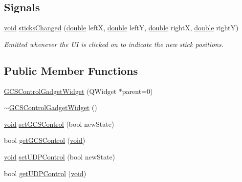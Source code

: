 \subsection*{Signals}
\begin{DoxyCompactItemize}
\item 
\hyperlink{group___u_a_v_objects_plugin_ga444cf2ff3f0ecbe028adce838d373f5c}{void} \hyperlink{group___g_c_s_control_gadget_plugin_gacad03ad4b99da2390b6a712a475b4987}{sticks\-Changed} (\hyperlink{_super_l_u_support_8h_a8956b2b9f49bf918deed98379d159ca7}{double} left\-X, \hyperlink{_super_l_u_support_8h_a8956b2b9f49bf918deed98379d159ca7}{double} left\-Y, \hyperlink{_super_l_u_support_8h_a8956b2b9f49bf918deed98379d159ca7}{double} right\-X, \hyperlink{_super_l_u_support_8h_a8956b2b9f49bf918deed98379d159ca7}{double} right\-Y)
\begin{DoxyCompactList}\small\item\em Emitted whenever the U\-I is clicked on to indicate the new stick positions. \end{DoxyCompactList}\end{DoxyCompactItemize}
\subsection*{Public Member Functions}
\begin{DoxyCompactItemize}
\item 
\hyperlink{group___g_c_s_control_gadget_plugin_ga631488a05f2911312aa2701deafc099e}{G\-C\-S\-Control\-Gadget\-Widget} (Q\-Widget $\ast$parent=0)
\item 
\hyperlink{group___g_c_s_control_gadget_plugin_gac531923c2dca3888a8ff072acf4949f6}{$\sim$\-G\-C\-S\-Control\-Gadget\-Widget} ()
\item 
\hyperlink{group___u_a_v_objects_plugin_ga444cf2ff3f0ecbe028adce838d373f5c}{void} \hyperlink{group___g_c_s_control_gadget_plugin_gaa7bf374aeebdf1e677885605644c508c}{set\-G\-C\-S\-Control} (bool new\-State)
\item 
bool \hyperlink{group___g_c_s_control_gadget_plugin_ga4802bb05a27e5b7b98fba727aa298cbf}{get\-G\-C\-S\-Control} (\hyperlink{group___u_a_v_objects_plugin_ga444cf2ff3f0ecbe028adce838d373f5c}{void})
\item 
\hyperlink{group___u_a_v_objects_plugin_ga444cf2ff3f0ecbe028adce838d373f5c}{void} \hyperlink{group___g_c_s_control_gadget_plugin_ga8e3fea7e5b4e9a7811faccbbe646ad37}{set\-U\-D\-P\-Control} (bool new\-State)
\item 
bool \hyperlink{group___g_c_s_control_gadget_plugin_ga0354d422f9780a2e5fb610c0decf3e13}{get\-U\-D\-P\-Control} (\hyperlink{group___u_a_v_objects_plugin_ga444cf2ff3f0ecbe028adce838d373f5c}{void})
\end{DoxyCompactItemize}
